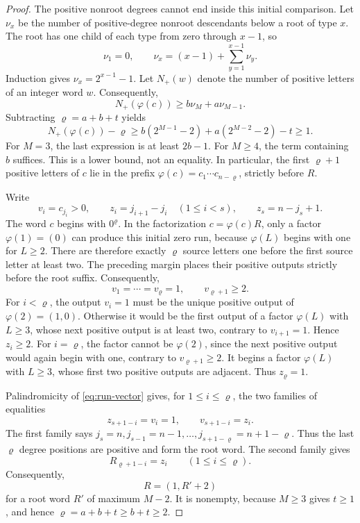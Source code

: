 \documentclass[11pt]{article}
\theoremstyle{definition}
\theoremstyle{remark}
\begin{document}
\begin{proof}
The positive nonroot degrees cannot end inside this initial comparison.  Let
\(\nu_x\) be the number of positive-degree nonroot descendants below a root of
type \(x\).  The root has one child of each type from zero through \(x-1\),
so
\[
 \nu_1=0,
 \qquad
 \nu_x=(x-1)+\sum_{y=1}^{x-1}\nu_y.
\]
Induction gives \(\nu_x=2^{x-1}-1\).  Let \(N_+(w)\) denote the number of
positive letters of an integer word \(w\).  Consequently,
\[
 N_+(\varphi(c))\geq b\nu_M+a\nu_{M-1}.
\]
Subtracting \(\varrho=a+b+t\) yields
\begin{equation*}
 N_+(\varphi(c))-\varrho
 \geq b(2^{M-1}-2)+a(2^{M-2}-2)-t\geq1.
\end{equation*}
For \(M=3\), the last expression is at least \(2b-1\).  For \(M\geq4\), the
term containing \(b\) suffices.  This is a lower bound, not an equality.
In particular, the first \(\varrho+1\) positive letters of \(c\) lie in the
prefix \(\varphi(c)=c_1\cdots c_{n-\varrho}\), strictly before \(R\).

Write
\[
 v_i=c_{j_i}>0,
 \qquad
 z_i=j_{i+1}-j_i\quad(1\leq i<s),
 \qquad
 z_s=n-j_s+1.
\]
The word \(c\) begins with \(0^{\varrho}\).  In the factorization
\(c=\varphi(c)R\), only a factor \(\varphi(1)=(0)\) can produce this initial
zero run, because \(\varphi(L)\) begins with one for \(L\geq2\).  There are
therefore exactly \(\varrho\) source letters one before the first source
letter at least two.  The preceding margin places their positive outputs
strictly before the root suffix.  Consequently,
\[
 v_1=\cdots=v_{\varrho}=1,
 \qquad v_{\varrho+1}\geq2.
\]
For \(i<\varrho\), the output \(v_i=1\) must be the unique positive output of
\(\varphi(2)=(1,0)\).  Otherwise it would be the first output of a factor
\(\varphi(L)\) with \(L\geq3\), whose next positive output is at least two,
contrary to \(v_{i+1}=1\).  Hence \(z_i\geq2\).  For \(i=\varrho\), the
factor cannot be \(\varphi(2)\), since the next positive output would again
begin with one, contrary to \(v_{\varrho+1}\geq2\).  It begins a factor
\(\varphi(L)\) with \(L\geq3\), whose first two positive outputs are adjacent.
Thus \(z_{\varrho}=1\).

Palindromicity of \eqref{eq:run-vector} gives, for
\(1\leq i\leq\varrho\), the two families of equalities
\[
 z_{s+1-i}=v_i=1,
 \qquad
 v_{s+1-i}=z_i.
\]
The first family says
\(j_s=n,j_{s-1}=n-1,\ldots,j_{s+1-\varrho}=n+1-\varrho\).  Thus the last
\(\varrho\) degree positions are positive and form the root word.  The
second family gives
\[
 R_{\varrho+1-i}=z_i
 \qquad(1\leq i\leq\varrho).
\]
Consequently,
\begin{equation}
\label{eq:root-descent}
 R=(1,R'+2)
\end{equation}
for a root word \(R'\) of maximum \(M-2\).  It is nonempty, because
\(M\geq3\) gives \(t\geq1\), and hence
\(\varrho=a+b+t\geq b+t\geq2\).


\end{proof}
\end{document}
